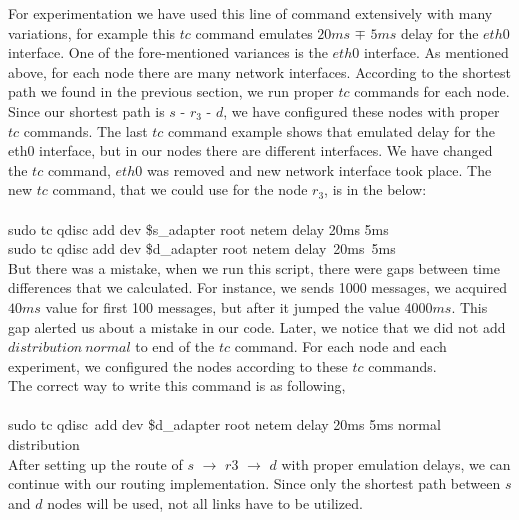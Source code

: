 \documentclass[conference]{IEEEtran}
\begin{document}
For experimentation we have used this line of command extensively with many variations, for example this $tc$ command emulates $20ms$ $\mp$ $5ms$ delay for the $eth0$ interface. One of the fore-mentioned variances is the $eth0$ interface. As mentioned above, for each node there are many network interfaces. According to the shortest path we found in the previous section, we run proper $tc$ commands for each node. Since our shortest path is $s$ - $r_3$ - $d$, we have configured these nodes with proper $tc$ commands. The last $tc$ command example shows that emulated delay for the eth0 interface, but in our nodes there are different interfaces. We have changed the $tc$ command, $eth0$ was removed and new network interface took place. The new $tc$ command, that we could use for the node $r_3$, is in the below: \\
\\
sudo tc qdisc add dev \$s\_adapter root netem delay 20ms 5ms \\
sudo tc qdisc add dev \$d\_adapter root netem delay\ 20ms\ 5ms 
\\

But there was a mistake, when we run this script, there were gaps between time differences that we calculated. For instance, we sends 1000 messages, we acquired $40ms$ value for first 100 messages, but after it jumped the value $4000ms$. This gap alerted us about a mistake in our code. Later, we notice that we did not add $distribution\ normal$ to end of the $tc$ command. For each node and each experiment, we configured the nodes according to these $tc$ commands.  \\

The correct way to write this command is as following,\\
\\
sudo tc qdisc\ add dev \$d\_adapter root netem delay 20ms 5ms  normal  distribution \\

After setting up the route of $s$ $\longrightarrow$ $r3$ $\longrightarrow$ $d$ with proper emulation delays, we can continue with our routing implementation. Since only the shortest path between $s$ and $d$ nodes will be used, not all links have to be utilized.\\
\end{document}
